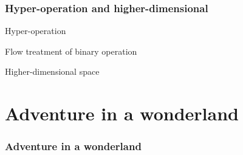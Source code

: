 \documentclass[aspectratio=169]{beamer}
\begin{document}
\begin{frame}
    \frametitle{Hyper-operation and higher-dimensional}
    Hyper-operation

    Flow treatment of binary operation

    Higher-dimensional space
\end{frame}

\section{Adventure in a wonderland}

\begin{frame}
\frametitle{Adventure in a wonderland}
\begin{figure}[ht]\centering
{}
\end{figure}
\end{frame}
\end{document}
